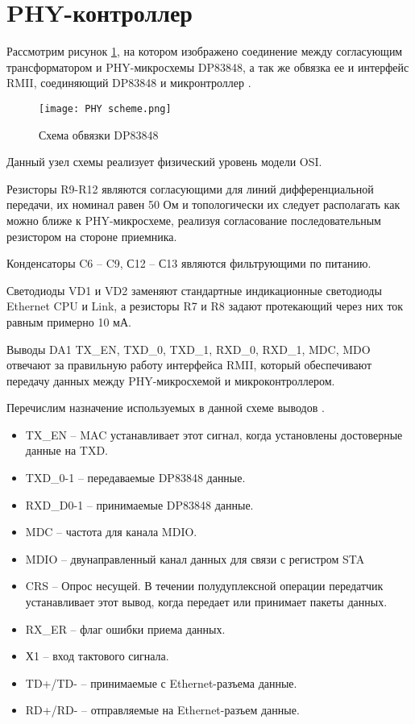 \section{PHY-контроллер}
\hspace{1cm} 


Рассмотрим рисунок \ref{ris:PhyScheme}, на котором изображено соединение между согласующим трансформатором 
и PHY-микросхемы DP83848, а так же обвязка ее и интерфейс RMII, соединяющий DP83848 и микронтроллер 
\cite{DP83848:datasheet}. 

\begin{figure}[H]
\centering
\texttt{[image: PHY scheme.png]}
\caption{Схема обвязки DP83848}
\label{ris:PhyScheme}
\end{figure}

Данный узел схемы реализует физический уровень модели OSI. 

Резисторы R9-R12 являются согласующими для линий дифференциальной передачи, их номинал равен 50 Ом и топологически 
их следует располагать как можно ближе к PHY-микросхеме, реализуя согласование последовательным резистором на 
стороне приемника. 

Конденсаторы C6 -- C9, С12 -- С13 являются фильтрующими по питанию. 

Светодиоды VD1 и VD2 заменяют стандартные индикационные светодиоды Ethernet CPU и Link, а резисторы 
R7 и R8 задают протекающий через них ток равным примерно 10 мА.  

Выводы DA1 TX\_EN, TXD\_0, TXD\_1, RXD\_0, RXD\_1, MDC, MDO отвечают за правильную работу интерфейса
RMII, который обеспечивают передачу данных между PHY-микросхемой и микроконтроллером. 

Перечислим назначение используемых в данной схеме выводов \cite{DP83848:datasheet}.
\begin{itemize}
    \item TX\_EN -- MAC устанавливает этот сигнал, когда установлены достоверные данные на TXD.
    \item TXD\_0-1 -- передаваемые DP83848 данные.
    \item RXD\_D0-1 -- принимаемые DP83848 данные.
    \item MDC -- частота для канала MDIO.
    \item MDIO -- двунаправленный канал данных для связи с регистром STA
    \item CRS -- Опрос несущей. В течении полудуплексной операции передатчик устанавливает этот 
    вывод, когда передает или принимает пакеты данных. 
    \item RX\_ER -- флаг ошибки приема данных. 
    \item Х1 -- вход тактового сигнала.
    \item TD+/TD- -- принимаемые с Ethernet-разъема данные.
    \item RD+/RD- -- отправляемые на Ethernet-разъем данные.
\end{itemize}
 